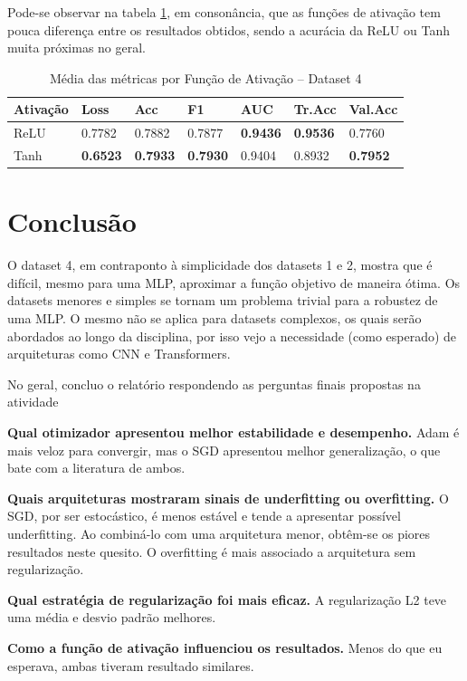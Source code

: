 \documentclass[12pt,a4paper]{article}
\begin{document}
Pode-se observar na tabela \ref{tab:mean_results_activation}, em consonância, que as funções de ativação tem pouca diferença entre os resultados obtidos, sendo a acurácia da ReLU ou Tanh muita próximas no geral. 

\begin{table}[h]
\centering
\caption{Média das métricas por Função de Ativação -- Dataset 4}
\label{tab:mean_results_activation}
\scriptsize
\setlength{\tabcolsep}{4pt}
\begin{tabular}{lllllll}
\toprule
\textbf{Ativação} & \textbf{Loss} & \textbf{Acc} & \textbf{F1} & \textbf{AUC} & \textbf{Tr.Acc} & \textbf{Val.Acc} \\
\midrule
ReLU & 0.7782 & 0.7882 & 0.7877 & \textbf{0.9436} & \textbf{0.9536} & 0.7760 \\
Tanh & \textbf{0.6523} & \textbf{0.7933} & \textbf{0.7930} & 0.9404 & 0.8932 & \textbf{0.7952} \\
\bottomrule
\end{tabular}
\end{table}

\newpage
\section{Conclusão}
O dataset 4, em contraponto à simplicidade dos datasets 1 e 2, mostra que é difícil, mesmo para uma MLP, aproximar a função objetivo de maneira ótima. Os datasets menores e simples se tornam um problema trivial para a robustez de uma MLP. O mesmo não se aplica para datasets complexos, os quais serão abordados ao longo da disciplina, por isso vejo a necessidade (como esperado) de arquiteturas como CNN e Transformers. 

No geral, concluo o relatório respondendo as perguntas finais propostas na atividade

\textbf{Qual otimizador apresentou melhor estabilidade e desempenho.}
Adam é mais veloz para convergir, mas o SGD apresentou melhor generalização, o que bate com a literatura de ambos.

\textbf{Quais arquiteturas mostraram sinais de underfitting ou overfitting.}
O SGD, por ser estocástico, é menos estável e tende a apresentar possível underfitting. Ao combiná-lo com uma arquitetura menor, obtêm-se os piores resultados neste quesito. O overfitting é mais associado a arquitetura sem regularização.

\textbf{Qual estratégia de regularização foi mais eficaz.}
A regularização L2 teve uma média e desvio padrão melhores.

\textbf{Como a função de ativação influenciou os resultados.}
Menos do que eu esperava, ambas tiveram resultado similares.
\end{document}
